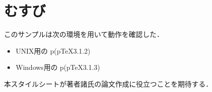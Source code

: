 \section{むすび}

このサンプルは次の環境を用いて動作を確認した．
\begin{itemize}
\item UNIX用の p\LaTeXe (p\TeX3.1.2)
\item Windows用の p\LaTeXe (p\TeX3.1.3)
\end{itemize}
本スタイルシートが著者諸氏の論文作成に役立つことを期待する．